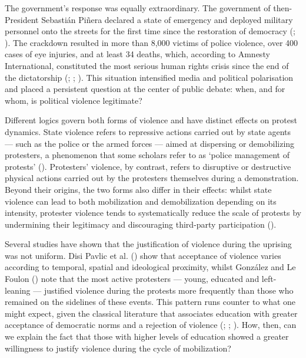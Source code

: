 \documentclass[
  13pt,
]{article}
\begin{document}
The government's response was equally extraordinary. The government of
then-President Sebastián Piñera declared a state of emergency and
deployed military personnel onto the streets for the first time since
the restoration of democracy (; ).
The crackdown resulted in more than 8,000 victims of police violence,
over 400 cases of eye injuries, and at least 34 deaths, which, according
to Amnesty International, constituted the most serious human rights
crisis since the end of the dictatorship
(;
;
). This
situation intensified media and political polarisation and placed a
persistent question at the center of public debate: when, and for whom,
is political violence legitimate?

Different logics govern both forms of violence and have distinct effects
on protest dynamics. State violence refers to repressive actions carried
out by state agents --- such as the police or the armed forces --- aimed
at dispersing or demobilizing protesters, a phenomenon that some
scholars refer to as `police management of protests'
(). Protesters' violence, by contrast, refers to disruptive or
destructive physical actions carried out by the protesters themselves
during a demonstration. Beyond their origins, the two forms also differ
in their effects: whilst state violence can lead to both mobilization
and demobilization depending on its intensity, protester violence tends
to systematically reduce the scale of protests by undermining their
legitimacy and discouraging third-party participation
().

Several studies have shown that the justification of violence during the
uprising was not uniform. Disi Pavlic et al.
() show that acceptance of violence varies according to temporal,
spatial and ideological proximity, whilst González and Le Foulon
() note
that the most active protesters --- young, educated and left-leaning ---
justified violence during the protests more frequently than those who
remained on the sidelines of these events. This pattern runs counter to
what one might expect, given the classical literature that associates
education with greater acceptance of democratic norms and a rejection of
violence (;
;
). How, then, can we
explain the fact that those with higher levels of education showed a
greater willingness to justify violence during the cycle of
mobilization?
\end{document}
